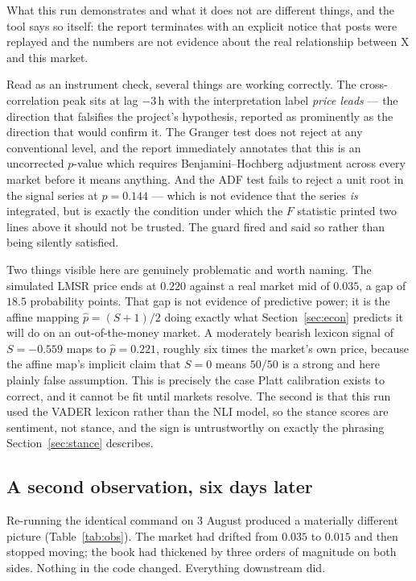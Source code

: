 \documentclass[11pt]{article}
\begin{document}
What this run demonstrates and what it does not are different things, and the
tool says so itself: the report terminates with an explicit notice that posts
were replayed and the numbers are not evidence about the real relationship
between X and this market.

Read as an instrument check, several things are working correctly. The
cross-correlation peak sits at lag $-3$\,h with the interpretation label
\emph{price leads} --- the direction that falsifies the project's hypothesis,
reported as prominently as the direction that would confirm it. The Granger test
does not reject at any conventional level, and the report immediately annotates
that this is an uncorrected $p$-value which requires Benjamini--Hochberg
adjustment across every market before it means anything. And the ADF test fails
to reject a unit root in the signal series at $p = 0.144$ --- which is not
evidence that the series \emph{is} integrated, but is exactly the condition
under which the $F$ statistic printed two lines above it should not be trusted.
The guard fired and said so rather than being silently satisfied.

Two things visible here are genuinely problematic and worth naming. The
simulated LMSR price ends at $0.220$ against a real market mid of $0.035$, a gap
of $18.5$ probability points. That gap is not evidence of predictive power; it
is the affine mapping $\hat{p} = (S+1)/2$ doing exactly what
Section~\ref{sec:econ} predicts it will do on an out-of-the-money market. A
moderately bearish lexicon signal of $S = -0.559$ maps to $\hat{p} = 0.221$,
roughly six times the market's own price, because the affine map's implicit
claim that $S = 0$ means $50/50$ is a strong and here plainly false
assumption. This is precisely the case Platt
calibration exists to correct, and it cannot be fit until markets resolve. The
second is that this run used the VADER lexicon rather than the NLI model, so the
stance scores are sentiment, not stance, and the sign is untrustworthy on exactly
the phrasing Section~\ref{sec:stance} describes.

\subsection{A second observation, six days later}
\label{sec:obs2}

Re-running the identical command on 3 August produced a materially different
picture (Table~\ref{tab:obs}). The market had drifted from $0.035$ to $0.015$ and
then stopped moving; the book had thickened by three orders of magnitude on both
sides. Nothing in the code changed. Everything downstream did.
\end{document}
